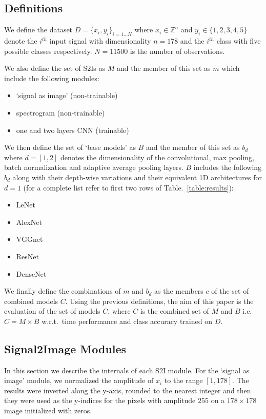 \documentclass[conference]{IEEEtran}
\begin{document}
\subsection{Definitions}
We define the dataset $D=\{x_i, y_i\}_{i=1\ldots N}$ where $x_i \in
\mathbb{Z}^n$ and $y_i \in \{1, 2, 3, 4, 5\}$ denote the $i^{th}$
input signal with dimensionality $n=178$ and the $i^{th}$ class with
five possible classes respectively.
$N=11500$ is the number of observations.

We also define the set of S2Is as $M$ and the member of this set as
$m$ which include the following modules:
\begin{itemize}
  \item `signal as image' (non-trainable)
  \item spectrogram (non-trainable)
  \item one and two layers CNN (trainable)
\end{itemize}

We then define the set of `base models' as $B$ and the member of this
set as $b_d$ where $d=[1,2]$ denotes the dimensionality of the
convolutional, max pooling, batch normalization and adaptive average
pooling layers.
$B$ includes the following $b_d$ along with their depth-wise
variations and their equivalent 1D architectures for $d=1$ (for a
complete list refer to first two rows of Table.~\ref{table:results}):
\begin{itemize}
  \item LeNet~\cite{lecun1998gradient}
  \item AlexNet~\cite{krizhevsky2012imagenet}
  \item VGGnet~\cite{simonyan2014very}
  \item ResNet~\cite{he2016deep}
  \item DenseNet~\cite{huang2017densely}
\end{itemize}

We finally define the combinations of $m$ and $b_d$ as the members
$c$ of the set of combined models $C$.
Using the previous definitions, the aim of this paper is the
evaluation of the set of models $C$, where $C$ is the combined set of
$M$ and $B$ i.e. $C=M\times B$ w.r.t.\ time performance and class
accuracy trained on $D$.

\subsection{Signal2Image Modules}
In this section we describe the internals of each S2I module.
For the `signal as image' module, we normalized the amplitude of
$x_i$ to the range $[1, 178]$.
The results were inverted along the y-axis, rounded to the nearest
integer and then they were used as the y-indices for the pixels with
amplitude $255$ on a $178\times 178$ image initialized with zeros.
\end{document}
